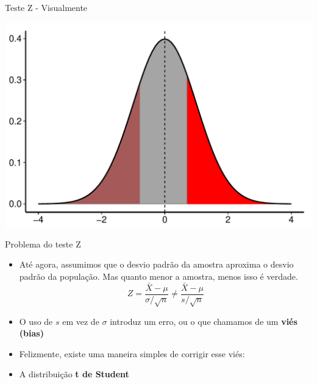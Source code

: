 \documentclass{beamer}\usepackage[]{graphicx}\usepackage[]{color}
\makeatletter
\def\maxwidth{ %
  \ifdim\Gin@nat@width>\linewidth
    \linewidth
  \else
    \Gin@nat@width
  \fi
}
\newenvironment{knitrout}{}{} %
\renewenvironment{knitrout}{\setlength{\topsep}{0mm}}{}
\makeatother
\begin{document}
\begin{frame}[fragile]{Teste Z -  Visualmente}

\begin{knitrout}
\color{fgcolor}
\includegraphics[width=\maxwidth,height=0.7\textheight]{figure/testez3-1} 

\end{knitrout}

\end{frame} 

\begin{frame}{Problema do teste Z}

\begin{itemize}

\item Até agora, assumimos que o desvio padrão da amostra aproxima o desvio padrão da população. Mas quanto menor a amostra, menos isso é verdade.
\vfill
\begin{equation*}
    Z = \frac{\bar{X} - \mu}{\sigma / \sqrt{n}} \neq \frac{\bar{X} - \mu}{s / \sqrt{n}}
\end{equation*}
\vfill
\item O uso de $s$ em vez de $\sigma$ introduz um erro, ou o que chamamos de um \textbf{viés (bias)}
\vfill
\item Felizmente, existe uma maneira simples de corrigir esse viés:
\vfill
\item A distribuição \textbf{t de Student}

\end{itemize}

\end{frame} 
\end{document}
